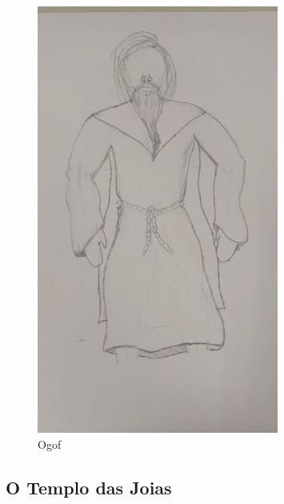 \begin{figure}[htb]
	\caption{\label{Ogof}Ogof}
	\begin{center}
	    \includegraphics[width=\textwidth/2]{imagens/Ogof.jpg}
	\end{center}
\end{figure}

\clearpage

\subsection{O Templo das Joias}

